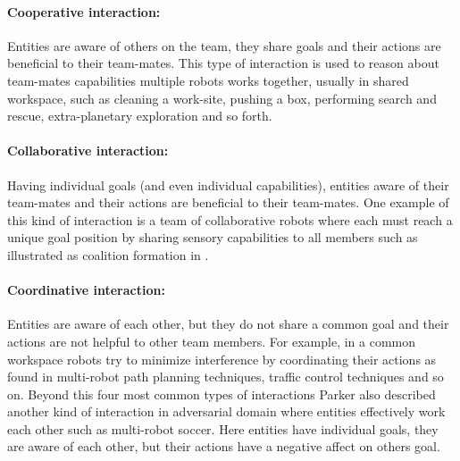 \paragraph{Cooperative interaction:}
Entities are aware of others on the team, they share goals and their actions are beneficial to their team-mates. This type of interaction is used to reason about team-mates capabilities multiple robots works together, usually in shared workspace, such as cleaning a work-site, pushing a box, performing search and rescue, extra-planetary exploration and so forth. 
\paragraph{Collaborative interaction:}
Having individual goals (and even individual capabilities), entities aware of their team-mates and their actions are beneficial to their team-mates. One example of this kind of interaction is a team of collaborative robots where each must reach a unique goal position by sharing sensory capabilities to all members such as illustrated as coalition formation in \cite{Parker+2006}.
\paragraph{Coordinative interaction:}
Entities are aware of each other, but they do not share a common goal and their actions are not helpful to other team members. For example, in a common workspace robots try to minimize interference by coordinating their actions as found in multi-robot path planning techniques, traffic control techniques and so on.
Beyond this four most common types of interactions Parker also described another kind of interaction in adversarial domain where entities effectively work each other such as multi-robot soccer. Here entities have individual goals, they are aware of each other, but their actions have a negative affect on others goal.
